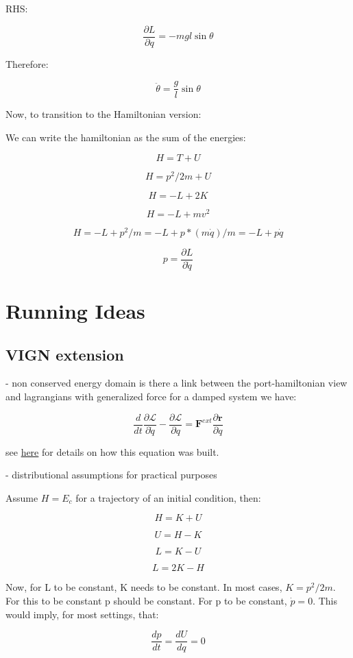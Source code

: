 \documentclass{article}
\begin{document}
RHS:

$$ \frac{\partial L}{\partial q} = -mgl\sin\theta$$

Therefore:

$$ \ddot{\theta} = \frac{g}{l} \sin \theta $$


Now, to transition to the Hamiltonian version:

We can write the hamiltonian as the sum of the energies:

$$ H = T + U $$

$$ H = p^2/2m + U $$

$$ H = -L + 2K $$

$$ H = -L + mv^2$$

$$ H = -L + p^2/m = -L + p* (m\dot{q})/m = -L + p\dot{q}$$

$$ p = \frac{\partial L}{\partial \dot{q}} $$


\section{Running Ideas}

\subsection{VIGN extension}

- non conserved energy domain
is there a link between the port-hamiltonian view and lagrangians with generalized force
for a damped system we have:

$$ \frac{d}{dt} \frac{\partial \mathcal{L}}{\partial \dot{q}} - \frac{\partial \mathcal{L}}{\partial q} = \mathbf{F}^{ext} \frac{\partial \mathbf{r}}{\partial q}$$

see \href{http://www.physics.hmc.edu/~saeta/courses/p111/uploads/Y2013/lec131023-DSHO.pdf}{here} for details on how this equation was built. 

- distributional assumptions for practical purposes

Assume $ H = E_c $ for a trajectory of an initial condition, then:

$$ H = K + U $$

$$U = H - K $$

$$ L = K - U $$

$$ L = 2K -H $$

Now, for L to be constant, K needs to be constant. In most cases, $ K = p^2/2m $. For this to be constant p should be constant. For p to be constant, $\dot{p} = 0$. This would imply, for most settings, that:

$$ \frac{dp}{dt} = \frac{dU}{dq} = 0 $$
\end{document}
